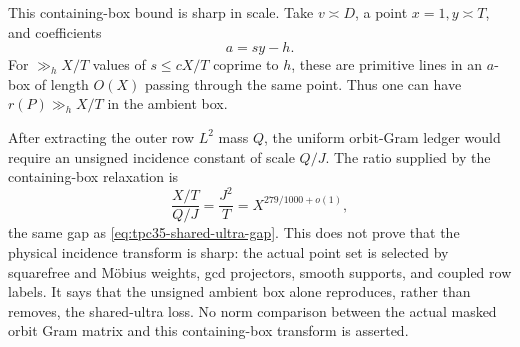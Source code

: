This containing-box bound is sharp in scale.  Take \(v\asymp D\), a point
\(x=1,y\asymp T\), and coefficients
\begin{equation}
 a=sy-h.
 \label{eq:tpc35-pencil-example}
\end{equation}
For \(\gg_h X/T\) values of \(s\le cX/T\) coprime to \(h\), these are
primitive lines in an \(a\)-box of length \(O(X)\) passing through the
same point.  Thus one can have \(r(P)\gg_h X/T\) in the ambient box.

After extracting the outer row \(L^2\) mass \(Q\), the uniform orbit-Gram
ledger would require an unsigned incidence constant of scale \(Q/J\).
The ratio supplied by the containing-box relaxation is
\begin{equation}
 \frac{X/T}{Q/J}=\frac{J^2}{T}
 =X^{279/1000+o(1)},
 \label{eq:tpc35-incidence-gap}
\end{equation}
the same gap as \eqref{eq:tpc35-shared-ultra-gap}.  This does not prove
that the physical incidence transform is sharp: the actual point set is
selected by squarefree and M\"obius weights, gcd projectors, smooth
supports, and coupled row labels.  It says that the unsigned ambient box
alone reproduces, rather than removes, the shared-ultra loss.
No norm comparison between the actual masked orbit Gram matrix and this
containing-box transform is asserted.
